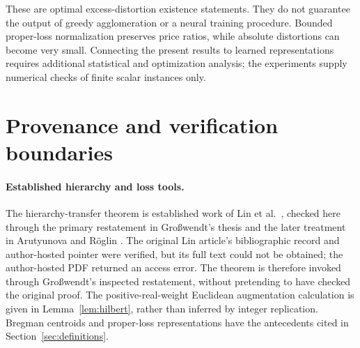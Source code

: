 \documentclass[11pt]{article}
\theoremstyle{definition}\newtheorem{definition}[theorem]{Definition}
\theoremstyle{remark}\newtheorem{remark}[theorem]{Remark}
\begin{document}
These are optimal excess-distortion existence statements. They do not guarantee the output of greedy agglomeration or a neural training procedure. Bounded proper-loss normalization preserves price ratios, while absolute distortions can become very small. Connecting the present results to learned representations requires additional statistical and optimization analysis; the experiments supply numerical checks of finite scalar instances only.

\section{Provenance and verification boundaries}
\label{sec:provenance}
\paragraph{Established hierarchy and loss tools.}
The hierarchy-transfer theorem is established work of Lin et al.\ \cite{lin}, checked here through the primary restatement in Gro\ss wendt's thesis \cite[Theorem 2.11]{grosswendt} and the later treatment in Arutyunova and R\"oglin \cite{arutyunova}. The original Lin article's bibliographic record and author-hosted pointer were verified, but its full text could not be obtained; the author-hosted PDF returned an access error. The theorem is therefore invoked through Gro\ss wendt's inspected restatement, without pretending to have checked the original proof. The positive-real-weight Euclidean augmentation calculation is given in Lemma~\ref{lem:hilbert}, rather than inferred by integer replication. Bregman centroids and proper-loss representations have the antecedents cited in Section~\ref{sec:definitions}.
\end{document}
